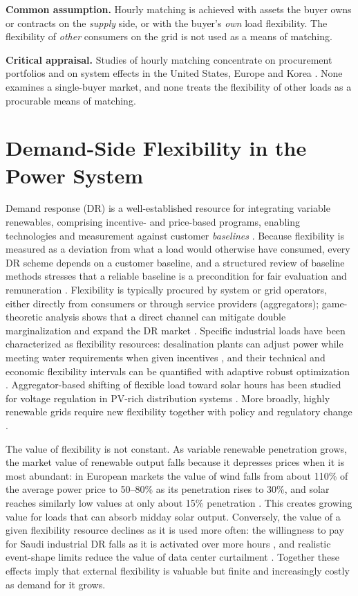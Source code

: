 \textbf{Common assumption.} Hourly matching is achieved with assets the buyer owns or contracts on the \emph{supply} side, or with the buyer's \emph{own} load flexibility. The flexibility of \emph{other} consumers on the grid is not used as a means of matching.

\textbf{Critical appraisal.} Studies of hourly matching concentrate on procurement portfolios and on system effects in the United States, Europe and Korea \cite{r10,r11,r14,r15,r16}. None examines a single-buyer market, and none treats the flexibility of other loads as a procurable means of matching.

\section{Demand-Side Flexibility in the Power System}\label{sec:2-8}

Demand response (DR) is a well-established resource for integrating variable renewables, comprising incentive- and price-based programs, enabling technologies and measurement against customer \emph{baselines} \cite{r17}. Because flexibility is measured as a deviation from what a load would otherwise have consumed, every DR scheme depends on a customer baseline, and a structured review of baseline methods stresses that a reliable baseline is a precondition for fair evaluation and remuneration \cite{r45}. Flexibility is typically procured by system or grid operators, either directly from consumers or through service providers (aggregators); game-theoretic analysis shows that a direct channel can mitigate double marginalization and expand the DR market \cite{r18}. Specific industrial loads have been characterized as flexibility resources: desalination plants can adjust power while meeting water requirements when given incentives \cite{r20}, and their technical and economic flexibility intervals can be quantified with adaptive robust optimization \cite{r19}. Aggregator-based shifting of flexible load toward solar hours has been studied for voltage regulation in PV-rich distribution systems \cite{r21}. More broadly, highly renewable grids require new flexibility together with policy and regulatory change \cite{r25}.

The value of flexibility is not constant. As variable renewable penetration grows, the market value of renewable output falls because it depresses prices when it is most abundant: in European markets the value of wind falls from about 110\% of the average power price to 50--80\% as its penetration rises to 30\%, and solar reaches similarly low values at only about 15\% penetration \cite{r44}. This creates growing value for loads that can absorb midday solar output. Conversely, the value of a given flexibility resource declines as it is used more often: the willingness to pay for Saudi industrial DR falls as it is activated over more hours \cite{r23}, and realistic event-shape limits reduce the value of data center curtailment \cite{r27}. Together these effects imply that external flexibility is valuable but finite and increasingly costly as demand for it grows.

